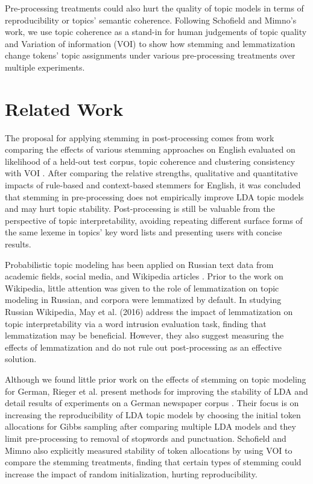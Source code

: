 \documentclass[11pt,a4paper]{article}
\begin{document}
Pre-processing treatments could also hurt the quality of topic models in terms of reproducibility or topics' semantic coherence. Following Schofield and Mimno's work, we use topic coherence as a stand-in for human judgements of topic quality \cite{mimno2011optimizing} and  Variation of information (VOI) \cite{Meila2003ComparingCB} to show how stemming and lemmatization change tokens' topic assignments under various pre-processing treatments over multiple experiments.


\section{Related Work}
The proposal for applying stemming in post-processing comes from work comparing the effects of various stemming approaches on English evaluated on likelihood of a held-out test corpus, topic coherence and clustering consistency with VOI \cite{schofield-mimno-2016-comparing}. After comparing the relative strengths, qualitative and quantitative impacts of rule-based and context-based stemmers for English, it was concluded that stemming in pre-processing does not empirically improve LDA topic models and may hurt topic stability. Post-processing is still be valuable from the perspective of topic interpretability, avoiding repeating different surface forms of the same lexeme in topics' key word lists and presenting users with concise results.

Probabilistic topic modeling has been applied on Russian text data from academic fields, social media, and Wikipedia articles \cite{mitrofanova2015probabilistic,koltsova2013,May2016AnAO}. Prior to the work on Wikipedia, little attention was given to the role of lemmatization on topic modeling in Russian, and corpora were lemmatized by default. In studying Russian Wikipedia, May et al. (2016) address the impact of lemmatization on topic interpretability via a word intrusion evaluation task, finding that lemmatization may be beneficial. However, they also suggest measuring the effects of lemmatization and do not rule out post-processing as an effective solution.

Although we found little prior work on the effects of stemming on topic modeling for German, Rieger et al. present methods for improving the stability of LDA and detail results of experiments on a German newspaper corpus \cite{Rieger2020ImprovingLD}. Their focus is on increasing the reproducibility of LDA topic models by choosing the initial token allocations for Gibbs sampling after comparing multiple LDA models and they limit pre-processing to removal of stopwords and punctuation. Schofield and Mimno also explicitly measured stability of token allocations by using VOI to compare the stemming treatments, finding that certain types of stemming could increase the impact of random initialization, hurting reproducibility.
\end{document}
